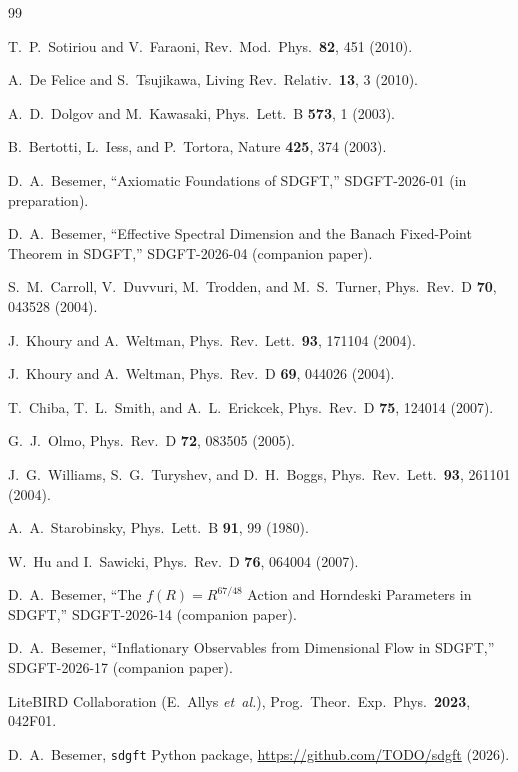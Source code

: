 \documentclass[amsmath,amssymb,aps,prd,twocolumn,superscriptaddress,nofootinbib]{revtex4-2}
\begin{document}
\begin{thebibliography}{99}

T.~P.~Sotiriou and V.~Faraoni,
Rev.\ Mod.\ Phys.\ \textbf{82}, 451 (2010).

A.~De Felice and S.~Tsujikawa,
Living Rev.\ Relativ.\ \textbf{13}, 3 (2010).

A.~D.~Dolgov and M.~Kawasaki,
Phys.\ Lett.\ B \textbf{573}, 1 (2003).

B.~Bertotti, L.~Iess, and P.~Tortora,
Nature \textbf{425}, 374 (2003).

D.~A.~Besemer, ``Axiomatic Foundations of SDGFT,''
SDGFT-2026-01 (in preparation).

D.~A.~Besemer, ``Effective Spectral Dimension and the Banach
Fixed-Point Theorem in SDGFT,''
SDGFT-2026-04 (companion paper).

S.~M.~Carroll, V.~Duvvuri, M.~Trodden, and M.~S.~Turner,
Phys.\ Rev.\ D \textbf{70}, 043528 (2004).

J.~Khoury and A.~Weltman,
Phys.\ Rev.\ Lett.\ \textbf{93}, 171104 (2004).

J.~Khoury and A.~Weltman,
Phys.\ Rev.\ D \textbf{69}, 044026 (2004).

T.~Chiba, T.~L.~Smith, and A.~L.~Erickcek,
Phys.\ Rev.\ D \textbf{75}, 124014 (2007).

G.~J.~Olmo,
Phys.\ Rev.\ D \textbf{72}, 083505 (2005).

J.~G.~Williams, S.~G.~Turyshev, and D.~H.~Boggs,
Phys.\ Rev.\ Lett.\ \textbf{93}, 261101 (2004).

A.~A.~Starobinsky,
Phys.\ Lett.\ B \textbf{91}, 99 (1980).

W.~Hu and I.~Sawicki,
Phys.\ Rev.\ D \textbf{76}, 064004 (2007).

D.~A.~Besemer, ``The $f(R) = R^{67/48}$ Action and Horndeski
Parameters in SDGFT,''
SDGFT-2026-14 (companion paper).

D.~A.~Besemer, ``Inflationary Observables from Dimensional
Flow in SDGFT,''
SDGFT-2026-17 (companion paper).

LiteBIRD Collaboration (E.~Allys {\it et~al.}),
Prog.\ Theor.\ Exp.\ Phys.\ \textbf{2023}, 042F01.

D.~A.~Besemer, \texttt{sdgft} Python package,
\url{https://github.com/TODO/sdgft} (2026).

\end{thebibliography}
\end{document}
